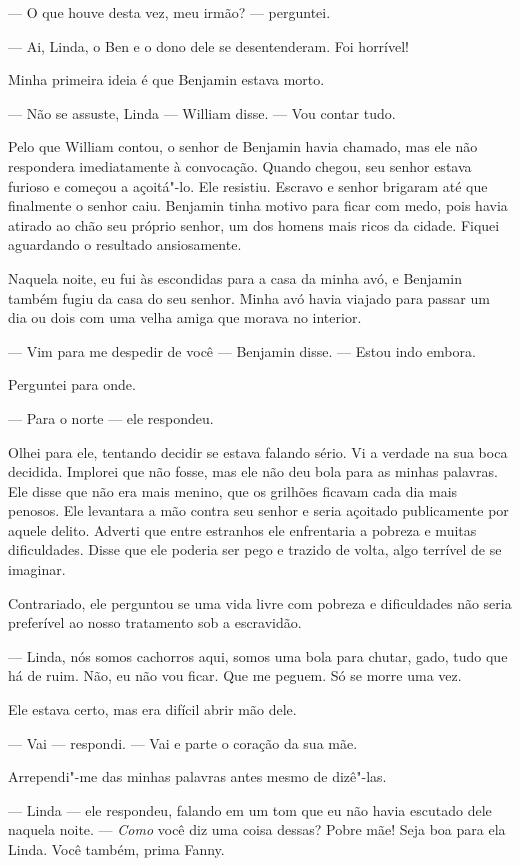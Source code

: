 --- O que houve desta vez, meu irmão? --- perguntei.

--- Ai, Linda, o Ben e o dono dele se
desentenderam. Foi horrível!

Minha primeira ideia é que Benjamin
estava morto.

--- Não se assuste, Linda --- William disse. --- Vou contar tudo.

Pelo que William contou, o senhor de
Benjamin havia chamado, mas ele não respondera imediatamente à
convocação. Quando chegou, seu senhor estava furioso e começou a
açoitá"-lo. Ele resistiu. Escravo e senhor brigaram até que finalmente o
senhor caiu. Benjamin tinha motivo para ficar com medo, pois havia
atirado ao chão seu próprio senhor, um dos homens mais ricos da cidade.
Fiquei aguardando o resultado ansiosamente.

Naquela noite, eu fui às escondidas
para a casa da minha avó, e Benjamin também fugiu da casa do seu senhor.
Minha avó havia viajado para passar um dia ou dois com uma velha amiga
que morava no interior.

--- Vim para me despedir de você ---
Benjamin disse. --- Estou indo embora.

Perguntei para onde.

--- Para o norte --- ele respondeu.

Olhei para ele, tentando decidir se
estava falando sério. Vi a verdade na sua boca decidida. Implorei que
não fosse, mas ele não deu bola para as minhas palavras. Ele disse que
não era mais menino, que os grilhões ficavam cada dia mais penosos. Ele
levantara a mão contra seu senhor e seria açoitado publicamente por
aquele delito. Adverti que entre estranhos ele enfrentaria a pobreza e
muitas dificuldades. Disse que ele poderia ser pego e trazido de volta,
algo terrível de se imaginar.

Contrariado, ele perguntou se uma vida
livre com pobreza e dificuldades não seria preferível ao nosso
tratamento sob a escravidão.

--- Linda, nós somos cachorros aqui, somos uma bola para chutar, gado,
tudo que há de ruim. Não, eu não vou ficar. Que me peguem. Só se morre
uma vez.

Ele estava certo, mas era difícil abrir
mão dele.

--- Vai --- respondi. --- Vai e parte o coração da sua mãe.

Arrependi"-me das minhas palavras antes
mesmo de dizê"-las.

--- Linda --- ele respondeu, falando em
um tom que eu não havia escutado dele naquela noite. --- \emph{Como}
você diz uma coisa dessas? Pobre mãe! Seja boa para ela Linda. Você
também, prima Fanny.

